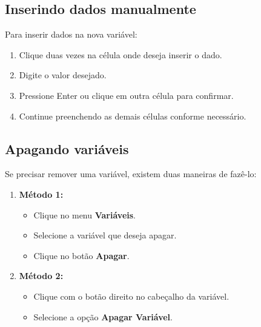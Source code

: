 
\subsection{Inserindo dados manualmente}

Para inserir dados na nova variável:

\begin{enumerate}
    \item Clique duas vezes na célula onde deseja inserir o dado.
    \item Digite o valor desejado.
    \item Pressione Enter ou clique em outra célula para confirmar.
    \item Continue preenchendo as demais células conforme necessário.
\end{enumerate}

\subsection{Apagando variáveis}

Se precisar remover uma variável, existem duas maneiras de fazê-lo:

\begin{enumerate}
    \item \textbf{Método 1:} 
    \begin{itemize}
        \item Clique no menu \textbf{Variáveis}.
        \item Selecione a variável que deseja apagar.
        \item Clique no botão \textbf{Apagar}.
    \end{itemize}
    
    \item \textbf{Método 2:}
    \begin{itemize}
        \item Clique com o botão direito no cabeçalho da variável.
        \item Selecione a opção \textbf{Apagar Variável}.
    \end{itemize}
\end{enumerate}

